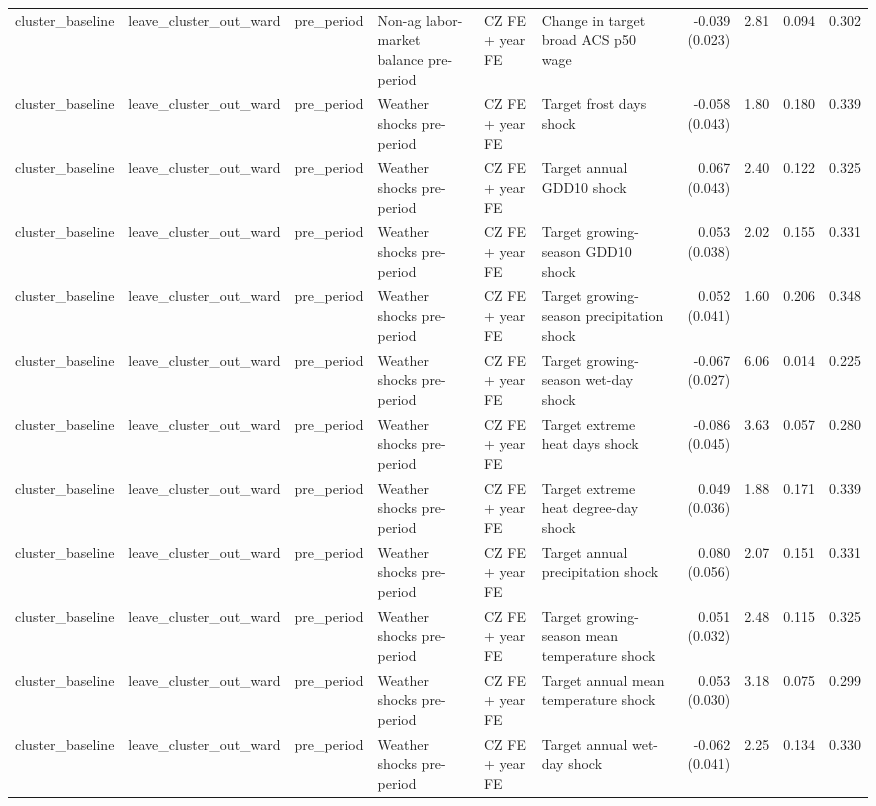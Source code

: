\begin{tabular}{llllllrrrr}
cluster_baseline & leave_cluster_out_ward & pre_period & Non-ag labor-market balance pre-period & CZ FE + year FE & Change in target broad ACS p50 wage & -0.039 (0.023) & 2.81 & 0.094 & 0.302 \\
cluster_baseline & leave_cluster_out_ward & pre_period & Weather shocks pre-period & CZ FE + year FE & Target frost days shock & -0.058 (0.043) & 1.80 & 0.180 & 0.339 \\
cluster_baseline & leave_cluster_out_ward & pre_period & Weather shocks pre-period & CZ FE + year FE & Target annual GDD10 shock & 0.067 (0.043) & 2.40 & 0.122 & 0.325 \\
cluster_baseline & leave_cluster_out_ward & pre_period & Weather shocks pre-period & CZ FE + year FE & Target growing-season GDD10 shock & 0.053 (0.038) & 2.02 & 0.155 & 0.331 \\
cluster_baseline & leave_cluster_out_ward & pre_period & Weather shocks pre-period & CZ FE + year FE & Target growing-season precipitation shock & 0.052 (0.041) & 1.60 & 0.206 & 0.348 \\
cluster_baseline & leave_cluster_out_ward & pre_period & Weather shocks pre-period & CZ FE + year FE & Target growing-season wet-day shock & -0.067 (0.027) & 6.06 & 0.014 & 0.225 \\
cluster_baseline & leave_cluster_out_ward & pre_period & Weather shocks pre-period & CZ FE + year FE & Target extreme heat days shock & -0.086 (0.045) & 3.63 & 0.057 & 0.280 \\
cluster_baseline & leave_cluster_out_ward & pre_period & Weather shocks pre-period & CZ FE + year FE & Target extreme heat degree-day shock & 0.049 (0.036) & 1.88 & 0.171 & 0.339 \\
cluster_baseline & leave_cluster_out_ward & pre_period & Weather shocks pre-period & CZ FE + year FE & Target annual precipitation shock & 0.080 (0.056) & 2.07 & 0.151 & 0.331 \\
cluster_baseline & leave_cluster_out_ward & pre_period & Weather shocks pre-period & CZ FE + year FE & Target growing-season mean temperature shock & 0.051 (0.032) & 2.48 & 0.115 & 0.325 \\
cluster_baseline & leave_cluster_out_ward & pre_period & Weather shocks pre-period & CZ FE + year FE & Target annual mean temperature shock & 0.053 (0.030) & 3.18 & 0.075 & 0.299 \\
cluster_baseline & leave_cluster_out_ward & pre_period & Weather shocks pre-period & CZ FE + year FE & Target annual wet-day shock & -0.062 (0.041) & 2.25 & 0.134 & 0.330 \\

\end{tabular}
